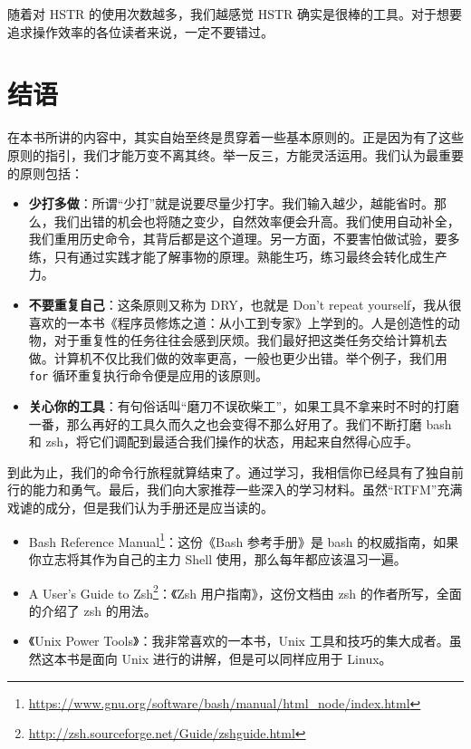 \documentclass[]{ctexbook}
\renewcommand{\href}[2]{#2\footnote{\url{#1}}}
\begin{document}
随着对 HSTR 的使用次数越多，我们越感觉 HSTR 确实是很棒的工具。对于想要追求操作效率的各位读者来说，一定不要错过。

\hypertarget{ux7ed3ux8bed}{%
\chapter{结语}\label{ux7ed3ux8bed}}

在本书所讲的内容中，其实自始至终是贯穿着一些基本原则的。正是因为有了这些原则的指引，我们才能万变不离其终。举一反三，方能灵活运用。我们认为最重要的原则包括：

\begin{itemize}
\item
  \textbf{少打多做}：所谓``少打''就是说要尽量少打字。我们输入越少，越能省时。那么，我们出错的机会也将随之变少，自然效率便会升高。我们使用自动补全，我们重用历史命令，其背后都是这个道理。另一方面，不要害怕做试验，要多练，只有通过实践才能了解事物的原理。熟能生巧，练习最终会转化成生产力。
\item
  \textbf{不要重复自己}：这条原则又称为 DRY，也就是 Don't repeat yourself，我从很喜欢的一本书《程序员修炼之道：从小工到专家》上学到的。人是创造性的动物，对于重复性的任务往往会感到厌烦。我们最好把这类任务交给计算机去做。计算机不仅比我们做的效率更高，一般也更少出错。举个例子，我们用 \texttt{for} 循环重复执行命令便是应用的该原则。
\item
  \textbf{关心你的工具}：有句俗话叫``磨刀不误砍柴工''，如果工具不拿来时不时的打磨一番，那么再好的工具久而久之也会变得不那么好用了。我们不断打磨 bash 和 zsh，将它们调配到最适合我们操作的状态，用起来自然得心应手。
\end{itemize}

到此为止，我们的命令行旅程就算结束了。通过学习，我相信你已经具有了独自前行的能力和勇气。最后，我们向大家推荐一些深入的学习材料。虽然``RTFM''充满戏谑的成分，但是我们认为手册还是应当读的。

\begin{itemize}
\item
  \href{https://www.gnu.org/software/bash/manual/html_node/index.html}{Bash Reference Manual}：这份《Bash 参考手册》是 bash 的权威指南，如果你立志将其作为自己的主力 Shell 使用，那么每年都应该温习一遍。
\item
  \href{http://zsh.sourceforge.net/Guide/zshguide.html}{A User's Guide to Zsh}：《Zsh 用户指南》，这份文档由 zsh 的作者所写，全面的介绍了 zsh 的用法。
\item
  《Unix Power Tools》：我非常喜欢的一本书，Unix 工具和技巧的集大成者。虽然这本书是面向 Unix 进行的讲解，但是可以同样应用于 Linux。
\end{itemize}

\backmatter
\printindex
\end{document}
